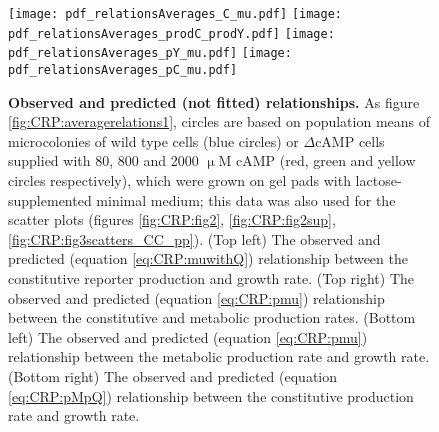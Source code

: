\begin{figure}%
	\centering
	\texttt{[image: pdf\_relationsAverages\_C\_mu.pdf]}
	\texttt{[image: pdf\_relationsAverages\_prodC\_prodY.pdf]}	
	\texttt{[image: pdf\_relationsAverages\_pY\_mu.pdf]}
	\texttt{[image: pdf\_relationsAverages\_pC\_mu.pdf]}	
	\caption{ 
		\textbf{Observed and predicted (not fitted) relationships.}
        As figure \ref{fig:CRP:averagerelations1}, circles 
        are based on population means of microcolonies of 
        wild type cells (blue circles) or $\Delta$cAMP cells supplied with 80, 800 and 2000 $\upmu$M cAMP (red, green and yellow circles respectively),
        which were grown on gel pads with lactose-supplemented minimal medium; 
        this data was also used for the scatter plots (figures \ref{fig:CRP:fig2}, \ref{fig:CRP:fig2sup}, \ref{fig:CRP:fig3scatters_CC_pp}).
		(Top left) The observed and predicted (equation \ref{eq:CRP:muwithQ}) relationship between the constitutive reporter production and growth rate.
		(Top right) The observed and predicted (equation \ref{eq:CRP:pmu}) relationship between the constitutive and metabolic production rates.
		(Bottom left) The observed and predicted (equation \ref{eq:CRP:pmu}) relationship between the metabolic production rate and growth rate.
		(Bottom right) The observed and predicted (equation \ref{eq:CRP:pMpQ}) relationship between the constitutive production rate and growth rate.
	}
	\label{fig:CRP:averagerelations2}
\end{figure}%



